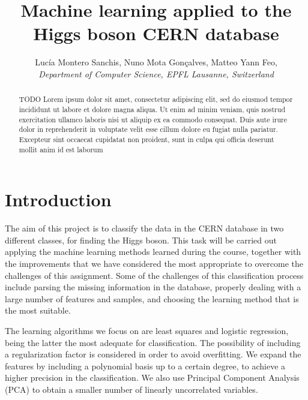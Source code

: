 \documentclass[10pt,conference,compsocconf]{IEEEtran}
\begin{document}
\title{Machine learning applied to the Higgs boson CERN database}

\author{
  Luc\'{i}a Montero Sanchis, Nuno Mota Gon\c{c}alves, Matteo Yann Feo,  \\
  \textit{Department of Computer Science, EPFL Lausanne, Switzerland}
}

\maketitle

\begin{abstract}
  TODO
  Lorem ipsum dolor sit amet, consectetur adipiscing elit, sed do eiusmod tempor incididunt ut labore et dolore magna aliqua. Ut enim ad minim veniam, quis nostrud exercitation ullamco laboris  nisi ut aliquip ex ea commodo consequat. Duis aute irure dolor in reprehenderit in voluptate velit esse cillum dolore eu fugiat nulla pariatur. Excepteur sint occaecat cupidatat non  proident, sunt in culpa qui officia deserunt mollit anim id est laborum
\end{abstract}

\section{Introduction}
The aim of this project is to classify the data in the CERN database in two different classes, for finding the Higgs boson. This task will be carried out applying the machine learning methods learned during the course, together with the improvements that we have considered the most appropriate to overcome the challenges of this assignment. Some of the challenges of this classification process include parsing the missing information in the database, properly dealing with a large number of features and samples, and choosing the learning method that is the most suitable.

The learning algorithms we focus on are least squares and logistic regression, being the latter the most adequate for classification. The possibility of including a regularization factor is considered in order to avoid overfitting. We expand the features by including a polynomial basis up to a certain degree, to achieve a higher precision in the classification. We also use Principal Component Analysis (PCA) to obtain a smaller number of linearly uncorrelated variables.

\end{document}
